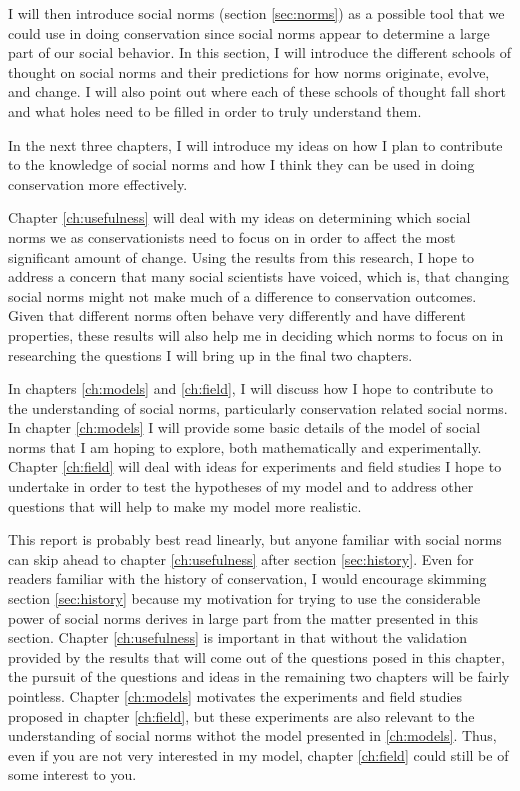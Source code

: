 \documentclass{report}
\begin{document}
I will then introduce social norms (section \ref{sec:norms}) as a possible tool that we could use in doing conservation since social norms appear to determine a large part of our social behavior. In this section, I will introduce the different schools of thought on social norms and their predictions for how norms originate, evolve, and change. I will also point out where each of these schools of thought fall short and what holes need to be filled in order to truly understand them.

In the next three chapters, I will introduce my ideas on how I plan to contribute to the knowledge of social norms and how I think they can be used in doing conservation more effectively. 

Chapter \ref{ch:usefulness} will deal with my ideas on determining which social norms we as conservationists need to focus on in order to affect the most significant amount of change. Using the results from this research, I hope to address a concern that many social scientists have voiced, which is, that changing social norms might not make much of a difference to conservation outcomes. Given that different norms often behave very differently and have different properties, these results will also help me in deciding which norms to focus on in researching the questions I will bring up in the final two chapters.

In chapters \ref{ch:models} and \ref{ch:field}, I will discuss how I hope to contribute to the understanding of social norms, particularly conservation related social norms. In chapter \ref{ch:models} I will provide some basic details of the model of social norms that I am hoping to explore, both mathematically and experimentally. Chapter \ref{ch:field} will deal with ideas for experiments and field studies I hope to undertake in order to test the hypotheses of my model and to address other questions that will help to make my model more realistic.

This report is probably best read linearly, but anyone familiar with social norms can skip ahead to chapter \ref{ch:usefulness} after section \ref{sec:history}. Even for readers familiar with the history of conservation, I would encourage skimming section \ref{sec:history} because my motivation for trying to use the considerable power of social norms derives in large part from the matter presented in this section. Chapter \ref{ch:usefulness} is important in that without the validation provided by the results that will come out of the questions posed in this chapter, the pursuit of the questions and ideas in the remaining two chapters will be fairly pointless. Chapter \ref{ch:models} motivates the experiments and field studies proposed in chapter \ref{ch:field}, but these experiments are also relevant to the understanding of social norms withot the model presented in \ref{ch:models}. Thus, even if you are not very interested in my model, chapter \ref{ch:field} could still be of some interest to you.
\end{document}
